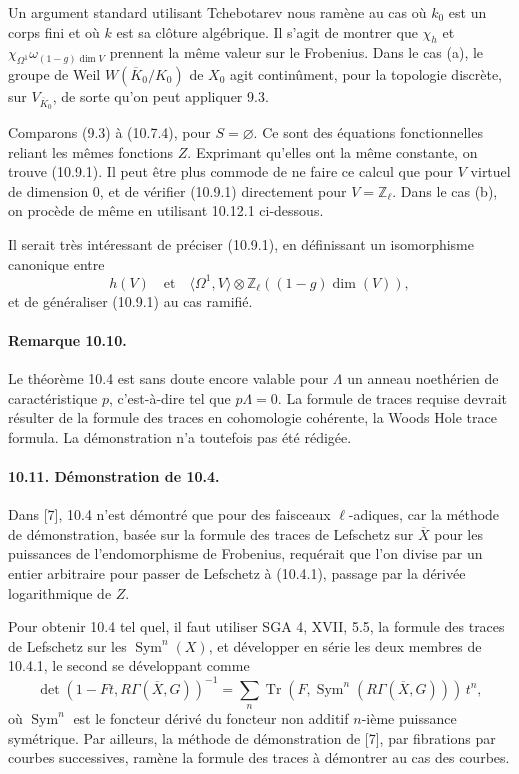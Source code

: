 \documentclass[10pt]{article}
\newcommand{\Z}{\mathbb Z}
\newcommand{\Tr}{\operatorname{Tr}}
\providecommand{\Tr}{\operatorname{Tr}}
\providecommand{\Tr}{\operatorname{Tr}}
\providecommand{\Sym}{\operatorname{Sym}}
\providecommand{\Tr}{\operatorname{Tr}}
\begin{document}
Un argument standard utilisant Tchebotarev nous ramène au cas où \(k_0\) est un corps fini et où \(k\) est sa clôture algébrique. Il s'agit de montrer que \(\chi_h\) et \(\chi_{\Omega^1}\omega_{(1-g)\dim V}\) prennent la même valeur sur le Frobenius. Dans le cas (a), le groupe de Weil \(W(\overline K_0/K_0)\) de \(X_0\) agit continûment, pour la topologie discrète, sur \(V_{\overline K_0}\), de sorte qu'on peut appliquer 9.3.

Comparons (9.3) à (10.7.4), pour \(S=\varnothing\). Ce sont des équations fonctionnelles reliant les mêmes fonctions \(Z\). Exprimant qu'elles ont la même constante, on trouve (10.9.1). Il peut être plus commode de ne faire ce calcul que pour \(V\) virtuel de dimension \(0\), et de vérifier (10.9.1) directement pour \(V=\Z_\ell\). Dans le cas (b), on procède de même en utilisant 10.12.1 ci-dessous.

Il serait très intéressant de préciser (10.9.1), en définissant un isomorphisme canonique entre
\[
h(V)
\quad\text{et}\quad
\langle\Omega^1,V\rangle\otimes \Z_\ell((1-g)\dim(V)),
\]
et de généraliser (10.9.1) au cas ramifié.

\paragraph{Remarque 10.10.} Le théorème 10.4 est sans doute encore valable pour \(\Lambda\) un anneau noethérien de caractéristique \(p\), c'est-à-dire tel que \(p\Lambda=0\). La formule de traces requise devrait résulter de la formule des traces en cohomologie cohérente, la Woods Hole trace formula. La démonstration n'a toutefois pas été rédigée.

\paragraph{10.11. Démonstration de 10.4.} Dans [7], 10.4 n'est démontré que pour des faisceaux \(\ell\)-adiques, car la méthode de démonstration, basée sur la formule des traces de Lefschetz sur \(\overline X\) pour les puissances de l'endomorphisme de Frobenius, requérait que l'on divise par un entier arbitraire pour passer de Lefschetz à (10.4.1), passage par la dérivée logarithmique de \(Z\).

Pour obtenir 10.4 tel quel, il faut utiliser SGA 4, XVII, 5.5, la formule des traces de Lefschetz sur les \(\Sym^n(X)\), et développer en série les deux membres de 10.4.1, le second se développant comme
\[
\det(1-Ft,R\Gamma(\overline X,G))^{-1}
=
\sum_n \Tr(F,\Sym^n(R\Gamma(\overline X,G)))\,t^n,
\]
où \(\Sym^n\) est le foncteur dérivé du foncteur non additif \(n\)-ième puissance symétrique. Par ailleurs, la méthode de démonstration de [7], par fibrations par courbes successives, ramène la formule des traces à démontrer au cas des courbes.
\end{document}
